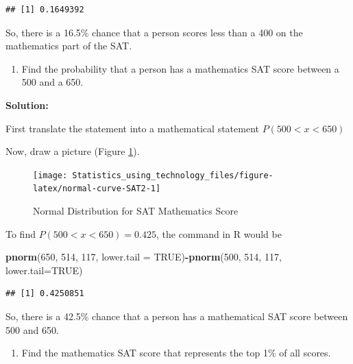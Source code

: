 \documentclass[
]{book}
\newenvironment{Shaded}{\begin{snugshade}}{\end{snugshade}}
\newcommand{\DataTypeTok}[1]{\textcolor[rgb]{0.13,0.29,0.53}{#1}}
\newcommand{\DecValTok}[1]{\textcolor[rgb]{0.00,0.00,0.81}{#1}}
\newcommand{\KeywordTok}[1]{\textcolor[rgb]{0.13,0.29,0.53}{\textbf{#1}}}
\newcommand{\NormalTok}[1]{#1}
\newcommand{\OperatorTok}[1]{\textcolor[rgb]{0.81,0.36,0.00}{\textbf{#1}}}
\newcommand{\OtherTok}[1]{\textcolor[rgb]{0.56,0.35,0.01}{#1}}
\providecommand{\tightlist}{%
  \setlength{\itemsep}{0pt}\setlength{\parskip}{0pt}}
\begin{document}
\begin{verbatim}
## [1] 0.1649392
\end{verbatim}

So, there is a 16.5\% chance that a person scores less than a 400 on the mathematics part of the SAT.

\begin{enumerate}
\def\labelenumi{\alph{enumi}.}
\setcounter{enumi}{3}
\tightlist
\item
  Find the probability that a person has a mathematics SAT score between a 500 and a 650.
\end{enumerate}

\textbf{Solution:}

First translate the statement into a mathematical statement \(P(500<x<650)\)

Now, draw a picture (Figure \ref{fig:normal-curve-SAT2}).



\begin{figure}
\texttt{[image: Statistics\_using\_technology\_files/figure-latex/normal-curve-SAT2-1]} \caption{Normal Distribution for SAT Mathematics Score}\label{fig:normal-curve-SAT2}
\end{figure}

To find \(P(500<x<650)=0.425\), the command in R would be

\begin{Shaded}
\begin{Highlighting}[]
\KeywordTok{pnorm}\NormalTok{(}\DecValTok{650}\NormalTok{, }\DecValTok{514}\NormalTok{, }\DecValTok{117}\NormalTok{, }\DataTypeTok{lower.tail =} \OtherTok{TRUE}\NormalTok{)}\OperatorTok{-}\KeywordTok{pnorm}\NormalTok{(}\DecValTok{500}\NormalTok{, }\DecValTok{514}\NormalTok{, }\DecValTok{117}\NormalTok{, }\DataTypeTok{lower.tail=}\OtherTok{TRUE}\NormalTok{)}
\end{Highlighting}
\end{Shaded}

\begin{verbatim}
## [1] 0.4250851
\end{verbatim}

So, there is a 42.5\% chance that a person has a mathematical SAT score between 500 and 650.

\begin{enumerate}
\def\labelenumi{\alph{enumi}.}
\setcounter{enumi}{4}
\tightlist
\item
  Find the mathematics SAT score that represents the top 1\% of all scores.
\end{enumerate}
\end{document}

